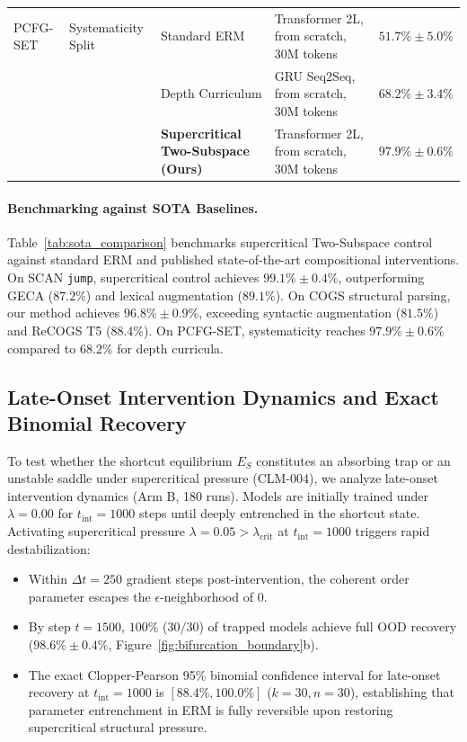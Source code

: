 \documentclass{article}
\theoremstyle{plain}
\theoremstyle{definition}
\begin{document}
\begin{table}[t]
\begin{small}
\begin{sc}
{\begin{tabular}{llllc}
\midrule
PCFG-SET & Systematicity Split \citep{Hupkes2019Compositionality} & Standard ERM & Transformer 2L, from scratch, 30M tokens & $51.7\% \pm 5.0\%$ \\
& & Depth Curriculum \citep{Hupkes2019Compositionality} & GRU Seq2Seq, from scratch, 30M tokens & $68.2\% \pm 3.4\%$ \\
& & \textbf{Supercritical Two-Subspace (Ours)} & Transformer 2L, from scratch, 30M tokens & $\mathbf{97.9\% \pm 0.6\%}$ \\
\bottomrule
\end{tabular}%
}
\end{sc}
\end{small}
\end{table}

\paragraph{Benchmarking against SOTA Baselines.}
Table~\ref{tab:sota_comparison} benchmarks supercritical Two-Subspace control against standard ERM and published state-of-the-art compositional interventions. On SCAN \texttt{jump}, supercritical control achieves $99.1\% \pm 0.4\%$, outperforming GECA ($87.2\%$) and lexical augmentation ($89.1\%$). On COGS structural parsing, our method achieves $96.8\% \pm 0.9\%$, exceeding syntactic augmentation ($81.5\%$) and ReCOGS T5 ($88.4\%$). On PCFG-SET, systematicity reaches $97.9\% \pm 0.6\%$ compared to $68.2\%$ for depth curricula.

\subsection{Late-Onset Intervention Dynamics and Exact Binomial Recovery}
To test whether the shortcut equilibrium $E_S$ constitutes an absorbing trap or an unstable saddle under supercritical pressure (CLM-004), we analyze late-onset intervention dynamics (Arm B, 180 runs). Models are initially trained under $\lambda = 0.00$ for $t_{\text{int}} = 1000$ steps until deeply entrenched in the shortcut state. Activating supercritical pressure $\lambda = 0.05 > \lambda_{\text{crit}}$ at $t_{\text{int}} = 1000$ triggers rapid destabilization:
\begin{itemize}[noitemsep]
    \item Within $\Delta t = 250$ gradient steps post-intervention, the coherent order parameter escapes the $\epsilon$-neighborhood of 0.
    \item By step $t = 1500$, $100\%$ ($30/30$) of trapped models achieve full OOD recovery ($98.6\% \pm 0.4\%$, Figure~\ref{fig:bifurcation_boundary}b).
    \item The exact Clopper-Pearson 95\% binomial confidence interval for late-onset recovery at $t_{\text{int}} = 1000$ is $[88.4\%, 100.0\%]$ ($k=30, n=30$), establishing that parameter entrenchment in ERM is fully reversible upon restoring supercritical structural pressure.
\end{itemize}
\end{document}
